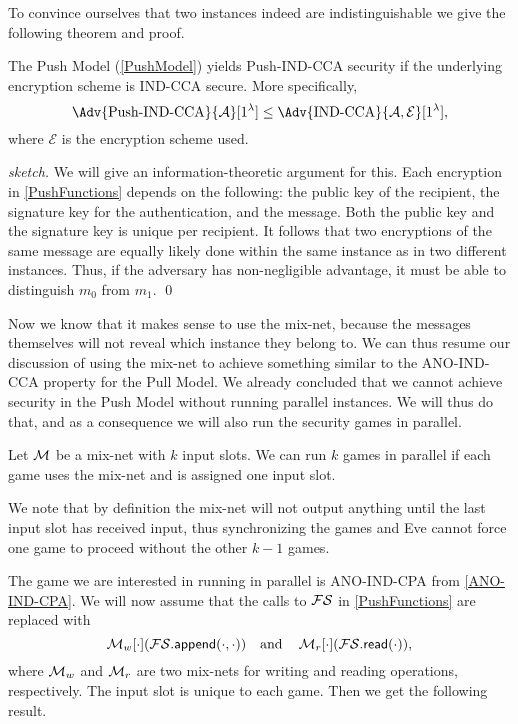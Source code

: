 To convince ourselves that two instances indeed are indistinguishable we give 
the following theorem and proof.

\begin{theorem}
  The Push Model (\cref{PushModel}) yields Push-IND-CCA security if the 
  underlying encryption scheme is IND-CCA secure.
  More specifically,
  \begin{equation*}
    \Adv{\text{Push-IND-CCA}}{\A}[1^\lambda]\leq \Adv{\text{IND-CCA}}{\A, 
      \mathcal{E}}[1^\lambda],
  \end{equation*}
  where \(\mathcal{E}\) is the encryption scheme used.
\end{theorem}

\begin{proof}[sketch]
  We will give an information-theoretic argument for this.
  Each encryption in \cref{PushFunctions} depends on the following:
  the public key of the recipient, the signature key for the authentication, 
  and the message.
  Both the public key and the signature key is unique per recipient.
  It follows that two encryptions of the same message are equally likely done 
  within the same instance as in two different instances.
  Thus, if the adversary has non-negligible advantage, it must be able to 
  distinguish \(m_0\) from \(m_1\).
  \qed{}
\end{proof}

Now we know that it makes sense to use the mix-net, because the messages 
themselves will not reveal which instance they belong to.
We can thus resume our discussion of using the mix-net to achieve something 
similar to the ANO-IND-CCA property for the Pull Model.
We already concluded that we cannot achieve security in the Push Model without 
running parallel instances.
We will thus do that, and as a consequence we will also run the security games 
in parallel.

\begin{definition}
  Let \(\operatorname{\mathcal{M}}\) be a mix-net with \(k\) input slots.
  We can run \(k\) games in parallel if each game uses the mix-net and is 
  assigned one input slot.
\end{definition}

We note that by definition the mix-net will not output anything until the last
input slot has received input, thus synchronizing the games and Eve cannot 
force one game to proceed without the other \(k-1\) games.

The game we are interested in running in parallel is ANO-IND-CPA from 
\cref{ANO-IND-CPA}.
We will now assume that the calls to \(\FS\) in \cref{PushFunctions} are 
replaced with \[\M_w[\cdot](\fswrite[\cdot][\cdot]) \quad\text{and}\quad 
  \M_r[\cdot](\fsread[\cdot]),\] where \(\operatorname{\mathcal{M}}_w\) and \(\operatorname{\mathcal{M}}_r\) are two mix-nets 
for writing and reading operations, respectively.
The input slot is unique to each game.
Then we get the following result.

